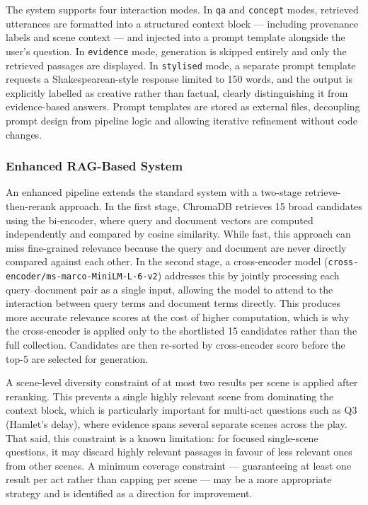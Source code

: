 \documentclass[10pt,conference]{IEEEtran}
\begin{document}
The system supports four interaction modes. In \texttt{qa} and \texttt{concept} modes,
retrieved utterances are formatted into a structured context block --- including provenance
labels and scene context --- and injected into a prompt template alongside the user's
question. In \texttt{evidence} mode, generation is skipped entirely and only the retrieved
passages are displayed. In \texttt{stylised} mode, a separate prompt template requests a
Shakespearean-style response limited to 150 words, and the output is explicitly labelled as
creative rather than factual, clearly distinguishing it from evidence-based answers. Prompt
templates are stored as external files, decoupling prompt design from pipeline logic and
allowing iterative refinement without code changes.

\subsubsection{Enhanced RAG-Based System}

An enhanced pipeline extends the standard system with a two-stage retrieve-then-rerank
approach. In the first stage, ChromaDB retrieves 15 broad candidates using the bi-encoder,
where query and document vectors are computed independently and compared by cosine
similarity. While fast, this approach can miss fine-grained relevance because the query and
document are never directly compared against each other. In the second stage, a cross-encoder
model (\texttt{cross-encoder/ms-marco-MiniLM-L-6-v2}) addresses this by jointly processing
each query--document pair as a single input, allowing the model to attend to the interaction
between query terms and document terms directly. This produces more accurate relevance scores
at the cost of higher computation, which is why the cross-encoder is applied only to the
shortlisted 15 candidates rather than the full collection. Candidates are then re-sorted by
cross-encoder score before the top-5 are selected for generation.

A scene-level diversity constraint of at most two results per scene is applied after
reranking. This prevents a single highly relevant scene from dominating the context block,
which is particularly important for multi-act questions such as Q3 (Hamlet's delay), where
evidence spans several separate scenes across the play. That said, this constraint is a
known limitation: for focused single-scene questions, it may discard highly relevant
passages in favour of less relevant ones from other scenes. A minimum coverage constraint
--- guaranteeing at least one result per act rather than capping per scene --- may be a
more appropriate strategy and is identified as a direction for improvement.
\end{document}

